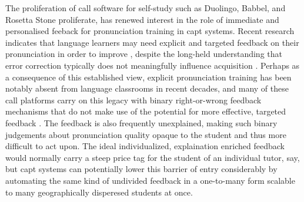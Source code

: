 \documentclass[thesis]{cluu}
\begin{document}
The proliferation of \gls{call} software for self-study such as Duolingo, Babbel, and Rosetta Stone proliferate, has renewed interest in the role of immediate and personalised feeback for pronunciation training in \gls{capt} systems. Recent research indicates that language learners may need explicit and targeted feedback on their pronunciation in order to improve \parencite{bajorek2017l2}, despite the long-held understanding that error correction typically does not meaningfully influence acquisition \parencite{krashenPrinciplesPracticeSecond1984}. Perhaps as a consequence of this established view, explicit pronunciation training has been notably absent from language classrooms in recent decades, and many of these \gls{call} platforms carry on this legacy with binary right-or-wrong feedback mechanisms that do not make use of the potential for more effective, targeted feedback \parencite{bajorek2017l2}. The feedback is also frequently unexplained, making such binary judgements about pronunciation quality opaque to the student and thus more difficult to act upon. The ideal individualized, explaination enriched feedback would normally carry a steep price tag for the student of an individual tutor, say, but \gls{capt} systems can potentially lower this barrier of entry considerably by automating the same kind of undivided feedback in a one-to-many form scalable to many geographically disperesed students at once. 
\end{document}
